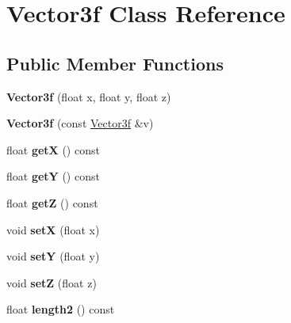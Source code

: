 \hypertarget{class_vector3f}{}\section{Vector3f Class Reference}
\label{class_vector3f}
\subsection*{Public Member Functions}
\begin{DoxyCompactItemize}
\item 
\mbox{\label{class_vector3f_a71033a308401bb8950d846a012d13da8}} 
{\bfseries Vector3f} (float x, float y, float z)
\item 
\mbox{\label{class_vector3f_ae1ae69e00043d02ebd7c7e4a24dde877}} 
{\bfseries Vector3f} (const \mbox{\hyperlink{class_vector3f}{Vector3f}} \&v)
\item 
\mbox{\label{class_vector3f_a76759eb4a7879906441ed9ad7385e4c3}} 
float {\bfseries getX} () const
\item 
\mbox{\label{class_vector3f_a2cf82f229b7d7d5398d7c9fd453a0fbc}} 
float {\bfseries getY} () const
\item 
\mbox{\label{class_vector3f_a0a87d639c7172d1c9eea7fac74f5e6ae}} 
float {\bfseries getZ} () const
\item 
\mbox{\label{class_vector3f_a3999baa8fa2c761253362f7e5f68bfec}} 
void {\bfseries setX} (float x)
\item 
\mbox{\label{class_vector3f_a533d6931dc15f0f0e66b094debeaf4ce}} 
void {\bfseries setY} (float y)
\item 
\mbox{\label{class_vector3f_a0cb5d2450424090a599f0e429f8f3a34}} 
void {\bfseries setZ} (float z)
\item 
\mbox{\label{class_vector3f_a6081a4bd906d2f0eda56ffb6a35d8218}} 
float {\bfseries length2} () const
\item 
\mbox{\label{class_vector3f_a92cc3ac93ffeb9d379398975d2232881}} 

\end{DoxyCompactItemize}
